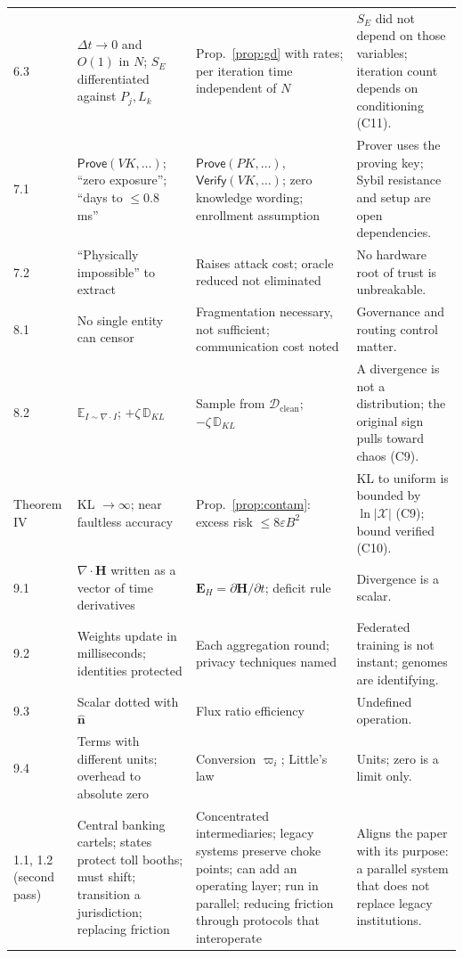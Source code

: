 \documentclass[11pt,a4paper]{article}
\theoremstyle{definition}
\theoremstyle{plain}
\theoremstyle{remark}
\begin{document}
\begin{longtable}{@{}p{1.9cm}p{4.0cm}p{5.2cm}p{4.1cm}@{}}
6.3 & $\Delta t \to 0$ and $O(1)$ in $N$; $S_E$ differentiated against $P_j, L_k$ & Prop.~\ref{prop:gd} with rates; per iteration time independent of $N$ & $S_E$ did not depend on those variables; iteration count depends on conditioning (C11). \\
7.1 & $\mathsf{Prove}(VK,\dots)$; ``zero exposure''; ``days to $\le 0.8$ ms'' & $\mathsf{Prove}(PK,\dots)$, $\mathsf{Verify}(VK,\dots)$; zero knowledge wording; enrollment assumption & Prover uses the proving key; Sybil resistance and setup are open dependencies. \\
7.2 & ``Physically impossible'' to extract & Raises attack cost; oracle reduced not eliminated & No hardware root of trust is unbreakable. \\
8.1 & No single entity can censor & Fragmentation necessary, not sufficient; communication cost noted & Governance and routing control matter. \\
8.2 & $\mathbb E_{I \sim \nabla\cdot I}$; $+\zeta\,\mathbb D_{KL}$ & Sample from $\mathcal D_{\mathrm{clean}}$; $-\zeta\,\mathbb D_{KL}$ & A divergence is not a distribution; the original sign pulls toward chaos (C9). \\
Theorem IV & KL $\to\infty$; near faultless accuracy & Prop.~\ref{prop:contam}: excess risk $\le 8\varepsilon B^2$ & KL to uniform is bounded by $\ln|\mathcal X|$ (C9); bound verified (C10). \\
9.1 & $\nabla\!\cdot\mathbf H$ written as a vector of time derivatives & $\mathbf E_H = \partial\mathbf H/\partial t$; deficit rule & Divergence is a scalar. \\
9.2 & Weights update in milliseconds; identities protected & Each aggregation round; privacy techniques named & Federated training is not instant; genomes are identifying. \\
9.3 & Scalar dotted with $\hat{\mathbf n}$ & Flux ratio efficiency & Undefined operation. \\
9.4 & Terms with different units; overhead to absolute zero & Conversion $\varpi_i$; Little's law & Units; zero is a limit only. \\
1.1, 1.2 (second pass) & Central banking cartels; states protect toll booths; must shift; transition a jurisdiction; replacing friction & Concentrated intermediaries; legacy systems preserve choke points; can add an operating layer; run in parallel; reducing friction through protocols that interoperate & Aligns the paper with its purpose: a parallel system that does not replace legacy institutions. \\

\end{longtable}
\end{document}
